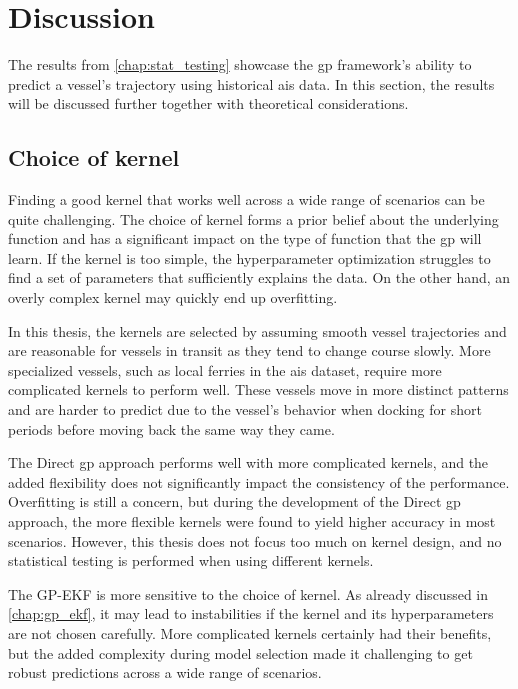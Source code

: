 \chapter{Discussion}\label{chap:discussion}

The results from \cref{chap:stat_testing} showcase the \acrshort{gp} framework's ability to predict a vessel's trajectory using historical \acrshort{ais} data. In this section, the results will be discussed further together with theoretical considerations.

\section{Choice of kernel}
Finding a good kernel that works well across a wide range of scenarios can be quite challenging. The choice of kernel forms a prior belief about the underlying function and has a significant impact on the type of function that the \acrshort{gp} will learn. If the kernel is too simple, the hyperparameter optimization struggles to find a set of parameters that sufficiently explains the data. On the other hand, an overly complex kernel may quickly end up overfitting.

In this thesis, the kernels are selected by assuming smooth vessel trajectories and are reasonable for vessels in transit as they tend to change course slowly. More specialized vessels, such as local ferries in the \acrshort{ais} dataset, require more complicated kernels to perform well. These vessels move in more distinct patterns and are harder to predict due to the vessel's behavior when docking for short periods before moving back the same way they came. 

The Direct \acrshort{gp} approach performs well with more complicated kernels, and the added flexibility does not significantly impact the consistency of the performance. Overfitting is still a concern, but during the development of the Direct \acrshort{gp} approach, the more flexible kernels were found to yield higher accuracy in most scenarios. However, this thesis does not focus too much on kernel design, and no statistical testing is performed when using different kernels.

The GP-EKF is more sensitive to the choice of kernel. As already discussed in \cref{chap:gp_ekf}, it may lead to instabilities if the kernel and its hyperparameters are not chosen carefully. More complicated kernels certainly had their benefits, but the added complexity during model selection made it challenging to get robust predictions across a wide range of scenarios.

